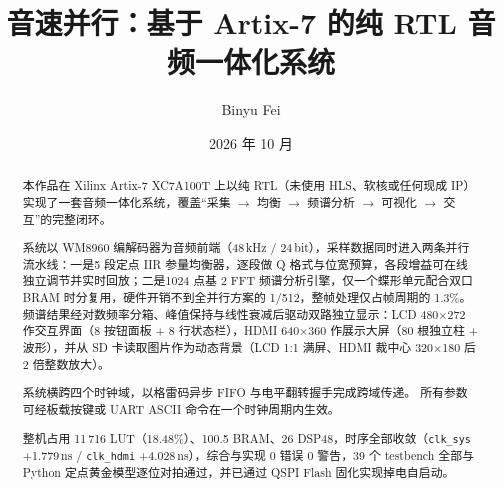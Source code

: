 \documentclass[withoutpreface,bwprint]{cumcmthesis}
\title{音速并行：基于 Artix-7 的纯 RTL 音频一体化系统}
\author{Binyu Fei}
\date{2026 年 10 月}
\begin{document}
\maketitle

%

\maketitle


\begin{abstract}
本作品在 Xilinx Artix-7 XC7A100T 上以纯 RTL（未使用 HLS、软核或任何现成 IP）实现了一套音频一体化系统，覆盖“采集 $\rightarrow$ 均衡 $\rightarrow$ 频谱分析 $\rightarrow$ 可视化 $\rightarrow$ 交互”的完整闭环。

系统以 WM8960 编解码器为音频前端（48\,kHz / 24\,bit），采样数据同时进入两条并行流水线：一是5 段定点 IIR 参量均衡器，逐段做 Q 格式与位宽预算，各段增益可在线独立调节并实时回放；二是1024 点基 2 FFT 频谱分析引擎，仅一个蝶形单元配合双口 BRAM 时分复用，硬件开销不到全并行方案的 1/512，整帧处理仅占帧周期的 1.3\%。频谱结果经对数频率分箱、峰值保持与线性衰减后驱动双路独立显示：LCD 480$\times$272 作交互界面（8 按钮面板 + 8 行状态栏），HDMI 640$\times$360 作展示大屏（80 根独立柱 + 波形），并从 SD 卡读取图片作为动态背景（LCD 1:1 满屏、HDMI 裁中心 320$\times$180 后 2 倍整数放大）。

系统横跨四个时钟域，以格雷码异步 FIFO 与电平翻转握手完成跨域传递。
所有参数可经板载按键或 UART ASCII 命令在一个时钟周期内生效。

整机占用 11\,716 LUT（18.48\%）、100.5 BRAM、26 DSP48，时序全部收敛（\texttt{clk\_sys} +1.779\,ns / \texttt{clk\_hdmi} +4.028\,ns），综合与实现 0 错误 0 警告，39 个 testbench 全部与 Python 定点黄金模型逐位对拍通过，并已通过 QSPI Flash 固化实现掉电自启动。

\end{abstract}
\end{document}
